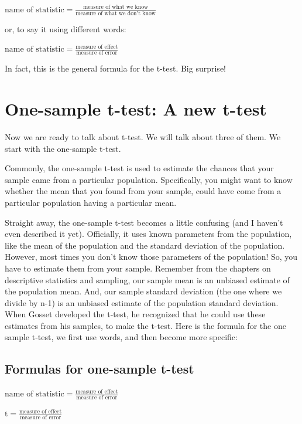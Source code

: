 \documentclass[]{book}
\begin{document}
\(\text{name of statistic} = \frac{\text{measure of what we know}}{\text{measure of what we don't know}}\)

or, to say it using different words:

\(\text{name of statistic} = \frac{\text{measure of effect}}{\text{measure of error}}\)

In fact, this is the general formula for the t-test. Big surprise!

\hypertarget{one-sample-t-test-a-new-t-test}{%
\section{One-sample t-test: A new t-test}\label{one-sample-t-test-a-new-t-test}}

Now we are ready to talk about t-test. We will talk about three of them. We start with the one-sample t-test.

Commonly, the one-sample t-test is used to estimate the chances that your sample came from a particular population. Specifically, you might want to know whether the mean that you found from your sample, could have come from a particular population having a particular mean.

Straight away, the one-sample t-test becomes a little confusing (and I haven't even described it yet). Officially, it uses known parameters from the population, like the mean of the population and the standard deviation of the population. However, most times you don't know those parameters of the population! So, you have to estimate them from your sample. Remember from the chapters on descriptive statistics and sampling, our sample mean is an unbiased estimate of the population mean. And, our sample standard deviation (the one where we divide by n-1) is an unbiased estimate of the population standard deviation. When Gosset developed the t-test, he recognized that he could use these estimates from his samples, to make the t-test. Here is the formula for the one sample t-test, we first use words, and then become more specific:

\hypertarget{formulas-for-one-sample-t-test}{%
\subsection{Formulas for one-sample t-test}\label{formulas-for-one-sample-t-test}}

\(\text{name of statistic} = \frac{\text{measure of effect}}{\text{measure of error}}\)

\(\text{t} = \frac{\text{measure of effect}}{\text{measure of error}}\)
\end{document}
